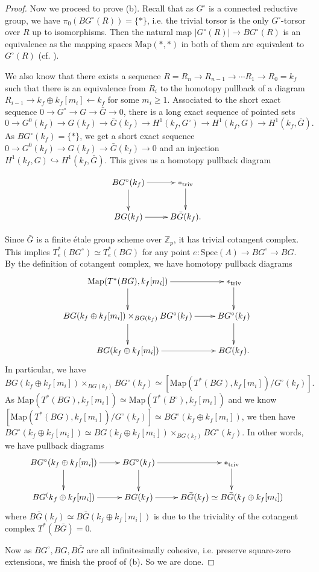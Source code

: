 \documentclass[10pt]{article}
\numberwithin{equation}{section}
\newcommand{\bZ}{{\mathbb Z}}
\newcommand{\Map}{\mathrm{Map}}
\newcommand{\Spec}{{\mathrm{Spec}}}         %
\begin{document}
\begin{proof}
Now we proceed to prove (b). Recall that as $G^\circ$ is a connected reductive group, we have $\pi_0(BG^\circ(R))=\{*\}$, i.e. the trivial torsor is the only $G^{\circ}$-torsor over $R$ up to isomorphisms. Then the natural map $|G^{\circ}(R)|\to BG^\circ(R)$ is an equivalence as the mapping spaces $\Map(*,*)$ in both of them are equivalent to $G^{\circ}(R)$ (cf. \cite[Lemma 5.2]{GV18}).

We also know that there exists a sequence $R=R_n\to R_{n-1}\to\cdots R_1\to R_0=k_f$ such that there is an equivalence from $R_i$ to the homotopy pullback of a diagram $R_{i-1}\to k_f\oplus k_f[m_i]\xleftarrow{}k_f$ for some $m_i\geq 1$. Associated to the short exact sequence $0\to G^{\circ}\to G\to \bar G\to 0$, there is a long exact sequence of pointed sets
\[
0\to G^0(k_f)\to G(k_f)\to \bar G(k_f)\to H^1(k_f,G^{\circ})\to H^1(k_f,G)\to H^1(k_f,\bar G).
\]
As $BG^{\circ}(k_f)=\{*\}$, we get a short exact sequence $0\to G^0(k_f)\to G(k_f)\to \bar G(k_f)\to 0$ and an injection $H^1(k_f,G)\hookrightarrow H^1(k_f,\bar G)$. This gives us a homotopy pullback diagram

\begin{equation*}
    \xymatrix{
    BG^\circ(k_f)\ar[r]\ar[d]& {*}_{\rm triv}\ar[d]\\
    BG(k_f)\ar[r]& B\bar G(k_f).
    }
\end{equation*}

Since $\bar G$ is a finite \'etale group scheme over $\bZ_p$, it has trivial cotangent complex. This implies $T^*_e(BG^{\circ})\simeq T^*_e(BG)$ for any point $e:\Spec(A)\to BG^{\circ}\to BG$. By the definition of cotangent complex, we have homotopy pullback diagrams
\begin{equation}
    \xymatrix{
    \Map(T^*(BG),k_f[m_i])\ar[r]\ar[d]& {*}_{\rm triv}\ar[d]\\
    BG(k_f\oplus k_f[m_i])\times_{BG(k_f)}BG^{\circ}(k_f)\ar[r]\ar[d]& BG^{\circ}(k_f)\ar[d]\\
    BG(k_f\oplus k_f[m_i])\ar[r]&BG(k_f).
    }
\end{equation}
In particular, we have \[BG(k_f\oplus k_f[m_i])\times_{BG(k_f)}BG^{\circ}(k_f)\simeq [\Map(T^*(BG),k_f[m_i])/G^{\circ}(k_f)].\] 
As $\Map(T^*(BG),k_f[m_i])\simeq \Map(T^*(B^{\circ}),k_f[m_i])$ and we know $[\Map(T^*(BG),k_f[m_i])/G^{\circ}(k_f)]\simeq BG^{\circ}(k_f\oplus k_f[m_i])$, we then have $BG^{\circ}(k_f\oplus k_f[m_i])\simeq BG(k_f\oplus k_f[m_i])\times_{BG(k_f)}BG^{\circ}(k_f)$. In other words, we have pullback diagrams
\begin{equation}
    \xymatrix{
    BG^{\circ}(k_f\oplus k_f[m_i])\ar[r]\ar[d]& BG^{\circ}(k_f)\ar[r]\ar[d]& {*}_{\rm triv}\ar[d]\\
    BG^(k_f\oplus k_f[m_i])\ar[r]& BG(k_f)\ar[r]& B\bar G(k_f)\simeq B\bar G(k_f\oplus k_f[m_i])
    }
\end{equation}
where $B\bar G(k_f)\simeq B\bar G(k_f\oplus k_f[m_i])$ is due to the triviality of the cotangent complex $T^*(B\bar G)=0$.

Now as $BG^{\circ}, BG, B\bar G$ are all infinitesimally cohesive, i.e. preserve square-zero extensions, we finish the proof of (b). So we are done.

\end{proof}
\end{document}
